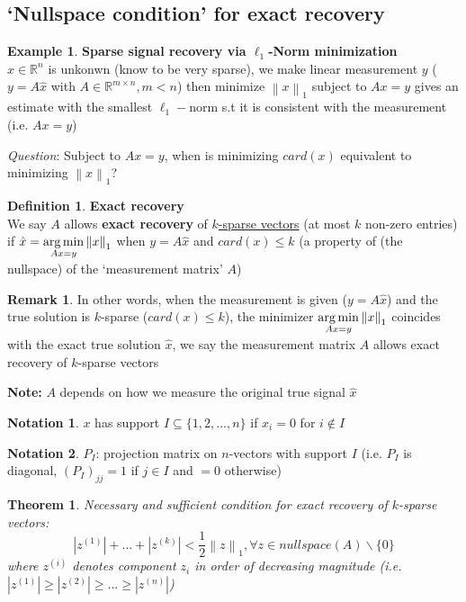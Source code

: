 \documentclass[10pt]{article}
\def\R{\mathbb{R}}
\def\argmin{\mathop{\rm arg\,min}}
\newtheorem{thm}{Theorem}[section]
\theoremstyle{definition}
\newtheorem{defn}{Definition}[section]
\newtheorem{example}{Example}[section]
\newtheorem{remark}{Remark}[section]
\newtheorem{notation}{Notation}[section]
\newcommand{\half}[0]{\frac{1}{2}}
\newcommand{\Note}[0]{\noindent\textbf{Note: }}
\newcommand{\norm}[1]{\left\lVert#1\right\rVert} %
\begin{document}
\subsection{‘Nullspace condition’ for exact recovery}

\begin{example}\textbf{Sparse signal recovery via $\ell_{1}$-Norm minimization}\\
	$\hat{x}\in \R^n$ is unkonwn (know to be very sparse),
	we make linear measurement $y$ ($y = A\hat{x}$ with $A \in \R^{m\times n}, m < n$)
	then minimize $\norm{x}_{1}$
	subject to
	$Ax = y$
	gives an estimate with the smallest $\ell_1-$norm s.t it is consistent with the measurement
	(i.e. $Ax = y$)
\end{example}

\textit{Question}: Subject to $Ax = y$, when is minimizing $card(x)$ equivalent to minimizing $\norm{x}_{1}$?

\begin{defn}\textbf{Exact recovery}\\
	We say $A$ allows \textbf{exact recovery} of \underline{$k$-sparse vectors}
	(at most $k$ non-zero entries) if
	$\hat{x} = \argmin\limits_{Ax=y}\norm{x}_{1}$
	when $y = A\hat{x}$ and \underline{$card(x) \le k$}
	(a property of (the nullspace) of the ‘measurement matrix’ $A$)
\end{defn}

\begin{remark}
	In other words, when the measurement is given ($y = A\hat{x}$)
	and the true solution is $k$-sparse ($card(x) \le k$),
	the minimizer $\argmin\limits_{Ax=y}\norm{x}_{1}$
	coincides with the exact true solution $\hat{x}$,
	we say the measurement matrix $A$ allows exact recovery of $k$-sparse vectors
\end{remark}
\Note $A$ depends on how we measure the original true signal $\hat{x}$

\begin{notation}
	$x$ has support $I \subseteq \{1,2,..., n\}$ if $x_i = 0$ for $i \not\in I$
\end{notation}

\begin{notation}
	$P_I$: projection matrix on $n$-vectors with support $I$
	(i.e. $P_I$ is diagonal, $(P_I)_{jj} = 1$ if $j \in I$ and $=0$ otherwise)
\end{notation}

\begin{thm}
	Necessary and sufficient condition for exact recovery of $k$-sparse vectors:
	$$|z^{(1)}| + ... + |z^{(k)}| < \half \norm{z}_{1}, \forall z \in nullspace(A)\backslash \{0\}$$
	where $z^{(i)}$ denotes component $z_i$ in order of decreasing magnitude
	(i.e. $|z^{(1)}| \ge |z^{(2)}| \ge ... \ge |z^{(n)}|$)
\end{thm}
\end{document}
